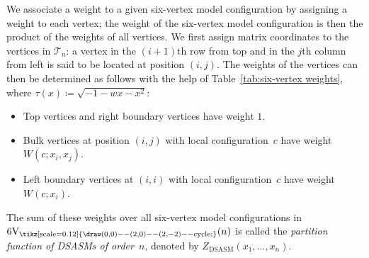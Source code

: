 \documentclass[ALCO, Unicode]{cedram}
\newcommand{\midarrow}{\tikz \draw[-triangle 90] (0,0) -- +(.1,0);}
\newcommand{\deff}[1]{\emph{#1}}
\newcommand{\DSASMSym}{
	\tikz[scale=0.12]{
		\draw (0,0) -- (2,0) -- (2,-2) -- cycle;
	}
}
\DeclareMathOperator{\DSASM}{DSASM}
\DeclareMathOperator{\SV}{6V_{\DSASMSym}}
\begin{document}
\begin{exm}
\begin{center}
		\end{center}
	\end{exm}
	
	We associate a weight to a given six-vertex model configuration by assigning a weight to each vertex; the weight of the six-vertex model configuration is then the product of the weights of all vertices. We first assign matrix coordinates to the vertices in $\mathcal{T}_n$: a vertex in the $(i+1)$th row from top and in the $j$th column from left is said to be located at position $(i,j)$. The weights of the vertices can then be determined as follows with the help of Table~\ref{tab:six-vertex weights}, where $\tau(x) \coloneqq \sqrt{-1-w x-x^2}$:
	\begin{itemize}
		\item Top vertices and right boundary vertices have weight $1$.
		\item Bulk vertices at position $(i,j)$ with local configuration~$c$ have weight $W(c;x_i,x_j)$.
		\item Left boundary vertices at $(i,i)$ with local configuration~$c$ have weight $W(c;x_i)$.
	\end{itemize}
	The sum of these weights over all six-vertex model configurations in $\SV(n)$ is called the \deff{partition function of DSASMs of order~$n$}, denoted by $Z_{\DSASM} (x_1,\dots,x_n)$.
	
\end{document}
